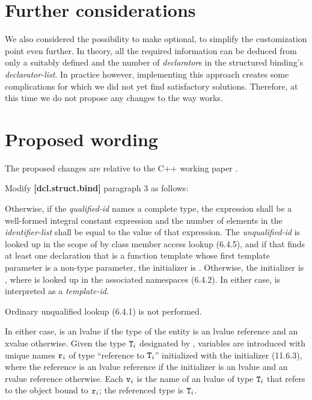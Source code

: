 \section{Further considerations}
\label{sec:considerations}

We also considered the possibility to make  optional, to simplify the customization point even further. In theory, all the required information can be deduced from only a suitably defined  and the number of \emph{declarator}s in the structured binding's \emph{declarator-list}. In practice however, implementing this approach creates some complications for which we did not yet find satisfactory solutions. Therefore, at this time we  do not propose any changes to the way  works.

\section{Proposed wording}
\label{sec:wording}

The proposed changes are relative to the C++ working paper \cite{Smith2018}.  

Modify \textbf{[dcl.struct.bind]} paragraph 3 as follows:

\begin{adjustwidth}{0.9cm}{0.9cm}
Otherwise, if the \emph{qualified-id}  names a complete type, the expression 
shall be a well-formed integral constant expression and the number of elements in the \emph{identifier-list} shall be equal to the value of that
expression. The \emph{unqualified-id}  is looked up in the scope of  by class member access lookup (6.4.5), and if that finds at least one declaration that is a function template whose first template parameter
is a non-type parameter, the initializer is . Otherwise, the initializer is , where  is looked up in the associated namespaces (6.4.2). In either case,  is interpreted as a \emph{template-id}.
\begin{note}
Ordinary unqualified lookup (6.4.1) is not performed.
\end{note}
In either case,  is an lvalue if the type of the entity  is an lvalue reference and an xvalue otherwise. Given the type $\texttt{T}_i$
designated by , variables are introduced with unique names $\texttt{r}_i$ of type ``reference to $\texttt{T}_i$'' initialized with the initializer (11.6.3), where the reference is an lvalue reference if the initializer is an lvalue and an rvalue reference otherwise. Each $\texttt{v}_i$ is the name of an lvalue of type $\texttt{T}_i$ that refers to the object bound to $\texttt{r}_i$; the referenced type is $\texttt{T}_i$.
\end{adjustwidth}

